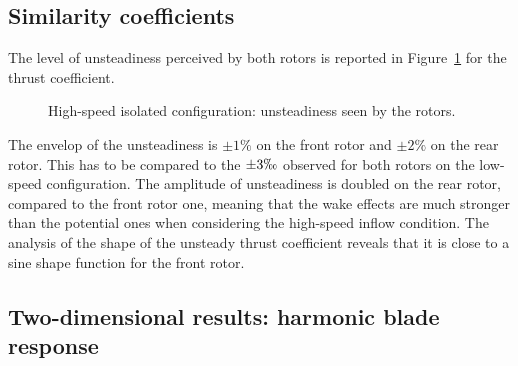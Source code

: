 
\subsection{Similarity coefficients}
\label{sub:dream_hs_hb_sim_coeff}


The level of unsteadiness perceived by both rotors is reported
in Figure~\ref{fig:dream_hs_hb_unst_coeff} for the thrust coefficient.
\begin{figure}[htp]
  \centering
  \caption{High-speed isolated configuration: unsteadiness seen by the rotors.}
  \label{fig:dream_hs_hb_unst_coeff}
\end{figure}
The envelop of the unsteadiness is $\pm 1\%$ on the front rotor
and $\pm 2\%$ on the rear rotor. This has to be compared to 
the $\pm 3 \permil$ observed for both rotors on the low-speed configuration.
The amplitude of unsteadiness is doubled on the rear rotor,
compared to the front rotor one,
meaning that the wake effects are much stronger than the
potential ones when considering the high-speed inflow condition.
The analysis of the shape of the unsteady thrust coefficient
reveals that it is close to a sine shape function for the front
rotor.

\subsection{Two-dimensional results: harmonic blade response}
\label{sub:dream_hs_hb_blade_response}

